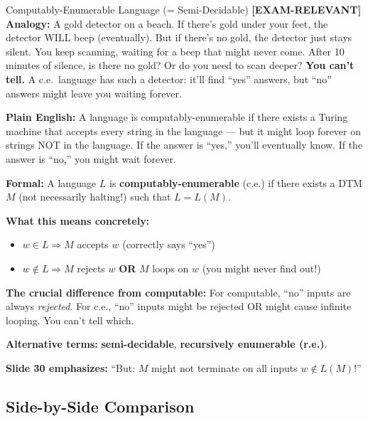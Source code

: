 \documentclass[11pt,a4paper]{article}
\newcommand{\kemark}{\textcolor{red!70!black}{\textbf{[EXAM-RELEVANT]}}}
\begin{document}
\begin{definitionbox}{Computably-Enumerable Language (= Semi-Decidable) \kemark}
\textbf{Analogy:} A gold detector on a beach. If there's gold under your feet, the detector WILL beep (eventually). But if there's no gold, the detector just stays silent. You keep scanning, waiting for a beep that might never come. After 10 minutes of silence, is there no gold? Or do you need to scan deeper? \textbf{You can't tell.} A c.e.\ language has such a detector: it'll find ``yes'' answers, but ``no'' answers might leave you waiting forever.

\textbf{Plain English:} A language is computably-enumerable if there exists a Turing machine that accepts every string in the language --- but it might loop forever on strings NOT in the language. If the answer is ``yes,'' you'll eventually know. If the answer is ``no,'' you might wait forever.

\textbf{Formal:} A language $L$ is \textbf{computably-enumerable} (c.e.) if there exists a DTM $M$ (not necessarily halting!) such that $L = L(M)$.

\textbf{What this means concretely:}
\begin{itemize}[nosep]
\item $w \in L \Rightarrow M$ accepts $w$ (correctly says ``yes'')
\item $w \notin L \Rightarrow M$ rejects $w$ \textbf{OR} $M$ loops on $w$ (you might never find out!)
\end{itemize}

\textbf{The crucial difference from computable:} For computable, ``no'' inputs are always \textit{rejected}. For c.e., ``no'' inputs might be rejected OR might cause infinite looping. You can't tell which.

\textbf{Alternative terms:} \textbf{semi-decidable}, \textbf{recursively enumerable (r.e.)}.

\textbf{Slide 30 emphasizes:} ``But: $M$ might not terminate on all inputs $w \notin L(M)$!''
\end{definitionbox}

\subsection{Side-by-Side Comparison}
\end{document}
